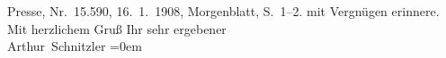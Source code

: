 \begin{ledgroupsized}[t]{13cm}
{{{{                        Presse}, Nr. 15.590, 16. 1. 1908,
                     Morgenblatt, S. 1–2.}}}\label{K_L02599-6h} mit Vergnügen erinnere.\pend
           \pstart
           Mit herzlichem Gruß Ihr sehr ergebener{\\[\baselineskip]}\spacefill\mbox{Arthur Schnitzler}\pend
           \leftskip=0em{}\endnumbering{}\end{ledgroupsized}  \newcommand{\dateiname}{L02599}\newcommand{\titel}{Arthur Schnitzler an Marie Herzfeld, 24. 1. 1908}\newcommand{\editorInnen}{Martin Anton Müller und Laura Untner}
            \footnotesize
\begin{ledgroupsized}[t]{11.5cm}
\end{ledgroupsized}
         
      